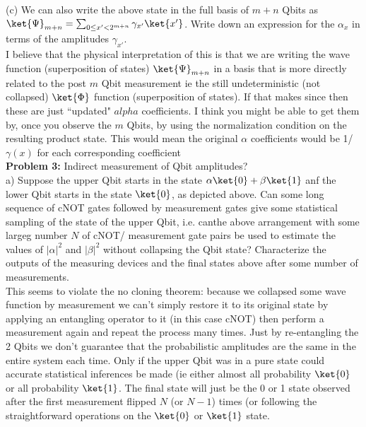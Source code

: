 (c) We can also write the above state in the full basis of $m+n$ Qbits as
$\ket{\Psi}_{m+n}=\sum_{0\leq x'<2^{m+n}}\gamma_{x'}\ket{x'}$. Write down an
expression for the $\alpha_x$ in terms of the amplitudes $\gamma_{x'}$.\\

I believe that the physical interpretation of this is that we are writing the wave function (superposition of states)
$\ket{\Psi}_{m+n}$ in a basis that is more directly related to the post $m$ Qbit
measurement ie the still  undeterministic (not collapsed) $\ket{\Phi}$ function (superposition of states). If that makes since then these are just ``updated" $alpha$ coefficients. I think you might be able to get them by, once you observe the $m$ Qbits, by using the normalization condition on the resulting product state. This would mean the original $\alpha$ coefficients would be 1/$\gamma(x)$ for each corresponding coefficient\\


\textbf{Problem 3:} Indirect measurement of Qbit amplitudes?\\

a) Suppose the upper Qbit starts in the state $\alpha\ket{0}+\beta\ket{1}$ anf
the lower Qbit starts in the state $\ket{0}$, as depicted above. Can some long
sequence of cNOT gates followed by measurement gates give some statistical
sampling of the state of the upper Qbit, i.e. canthe above arrangement with
some largeg number $N$ of cNOT/ measurement gate pairs be used to estimate the
values of $|\alpha|^2$ and $|\beta|^2$ without collapsing the Qbit state?
Characterize
the outputs of the measuring devices and the final states above after some
number of
measurements.\\

This seems to violate the no cloning theorem: because we collapsed some wave function by measurement we can't simply restore it to its original state by applying an
entangling operator to it (in this case cNOT) then perform a measurement
again and repeat the process many times. Just by re-entangling the 2
Qbits we don't guarantee that the probabilistic amplitudes are the same in the
entire system each time. Only if the upper Qbit was in a pure state could accurate
statistical inferences be made (ie either almost all probability $\ket{0}$ or
all probability $\ket{1}$. The final state will just be the 0 or 1 state
observed after the first measurement flipped $N$ (or $N-1$) times (or
following the straightforward operations on the $\ket{0}$ or $\ket{1}$ state.\\

